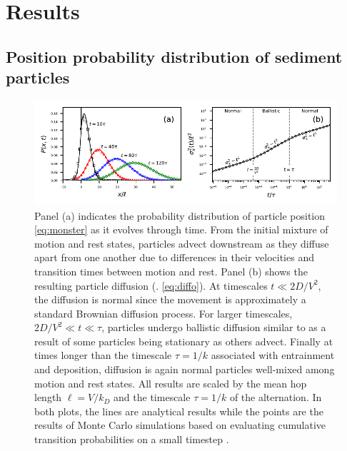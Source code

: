 \section{Results \label{sec:res}}
\subsection{Position probability distribution of sediment particles}
\begin{figure}
	\centerline{\includegraphics{figures/ch2/figure2_slopeKey.pdf}}
	\caption{Panel (a) indicates the probability distribution of particle position \DIFdelbeginFL {}\DIFdelendFL \ref{eq:monster} \DIFdelbeginFL \DIFdelFL{) }\DIFdelendFL as it evolves through time. From the initial mixture of motion and rest states, particles advect downstream as they diffuse apart from one another due to differences in their velocities and transition times between motion and rest. \DIFaddbeginFL {}\DIFaddendFL Panel (b) shows the resulting particle diffusion (\DIFdelbeginFL {}\DIFdelendFL \DIFaddbeginFL {}\DIFaddendFL . \ref{eq:diffo}). At timescales $t \ll 2D/V^2$, the diffusion is normal since the movement is approximately a standard Brownian diffusion process. For larger timescales, $2D/V^2 \ll t \ll \tau$, particles undergo ballistic diffusion similar to \citet{Lisle1998} as a result of some particles being stationary as others advect. Finally at times longer than the timescale $\tau = 1/k$ associated with entrainment and deposition, diffusion is again normal \DIFdelbeginFL {}\DIFdelendFL \DIFaddbeginFL {}\DIFaddendFL particles \DIFaddbeginFL {}\DIFaddendFL well-mixed among motion and rest states. All results are scaled by the mean hop length $\ell=V/k_D$ and the timescale $\tau=1/k$ of the \DIFdelbeginFL {}\DIFdelendFL \DIFaddbeginFL {}\DIFaddendFL alternation. In both plots, the lines are analytical results while the points are the results of Monte Carlo simulations based on evaluating cumulative transition probabilities on a small timestep \citep[e.g.][]{Barik2006}.}
	\label{fig:flippyfig1}
\end{figure}
